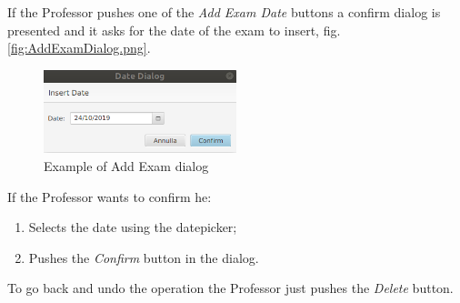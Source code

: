 \documentclass{report}
\begin{document}
If the Professor pushes one of the \textit{Add Exam Date} buttons a confirm dialog is presented and it asks for the date of the exam to insert, fig. \ref{fig:AddExamDialog.png}.
\begin{figure} [h!]
	\centering
	\includegraphics[width=0.5\textwidth]{AddExamDialog.png}
	\caption{Example of Add Exam dialog}
	\label{fig:AddExamDialog}
\end{figure} 
If the Professor wants to confirm he:
\begin{enumerate}
	\item Selects the date using the datepicker;
	\item Pushes the \textit{Confirm} button in the dialog.
\end{enumerate}
To go back and undo the operation the Professor just pushes the \textit{Delete} button.
\end{document}
